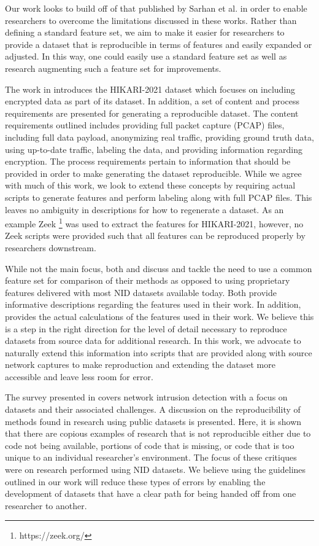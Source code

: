 \documentclass[conference]{IEEEtran}
\begin{document}
Our work looks to build off of that published by Sarhan et al. in order to enable researchers to overcome the limitations discussed in these works.
Rather than defining a standard feature set, we aim to make it easier for researchers to provide a dataset that is reproducible in terms of features and easily expanded or adjusted.
In this way, one could easily use a standard feature set as well as research augmenting such a feature set for improvements.

The work in \cite{ferriyan2021} introduces the HIKARI-2021 dataset which focuses on including encrypted data as part of its dataset.
In addition, a set of content and process requirements are presented for generating a reproducible dataset.
The content requirements outlined includes providing full packet capture (PCAP) files, including full data payload, anonymizing real traffic,  providing ground truth data, using up-to-date traffic, labeling the data, and providing information regarding encryption.
The process requirements pertain to information that should be provided in order to make generating the dataset reproducible.
While we agree with much of this work, we look to extend these concepts by requiring actual scripts to generate features and perform labeling along with full PCAP files.
This leaves no ambiguity in descriptions for how to regenerate a dataset.
As an example Zeek \footnote{https://zeek.org/} was used to extract the features for HIKARI-2021, however, no Zeek scripts were provided such that all features can be reproduced properly by researchers downstream.

While not the main focus, both \cite{e23111532} and \cite{layeghy2021} discuss and tackle the need to use a common feature set for comparison of their methods as opposed to using proprietary features delivered with most NID datasets available today.
Both provide informative descriptions regarding the features used in their work.
In addition, \cite{layeghy2021} provides the actual calculations of the features used in their work.
We believe this is a step in the right direction for the level of detail necessary to reproduce datasets from source data for additional research.
In this work, we advocate to naturally extend this information into scripts that are provided along with source network captures to make reproduction and extending the dataset more accessible and leave less room for error.

The survey presented in \cite{Chou2022} covers network intrusion detection with a focus on datasets and their associated challenges.
A discussion on the reproducibility of methods found in research using public datasets is presented.
Here, it is shown that there are copious examples of research that is not reproducible either due to code not being available, portions of code that is missing, or code that is too unique to an individual researcher's environment.
The focus of these critiques were on research performed using NID datasets.
We believe using the guidelines outlined in our work will reduce these types of errors by enabling the development of datasets that have a clear path for being handed off from one researcher to another.
\end{document}
